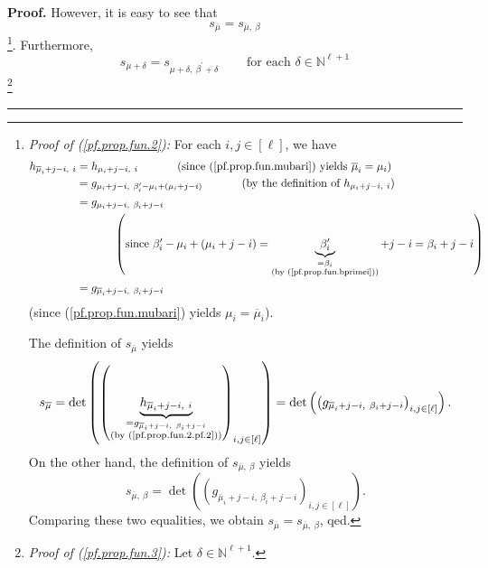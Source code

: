 \documentclass[numbers=enddot,12pt,final,onecolumn,notitlepage,english]{scrartcl}%
\theoremstyle{definition}
\newenvironment{proof}[1][Proof]{\noindent\textbf{#1.} }{\ \rule{0.5em}{0.5em}}
\newenvironment{verlong}{}{}
\begin{document}
\begin{verlong}
\begin{proof}
However, it is easy to see that%
\begin{equation}
s_{\overline{\mu}}=s_{\overline{\mu},\ \beta} \label{pf.prop.fun.2}%
\end{equation}
\footnote{\textit{Proof of (\ref{pf.prop.fun.2}):} For each $i,j\in\left[
\ell\right]  $, we have%
\begin{align}
h_{\overline{\mu}_{i}+j-i,\ i}  &  =h_{\mu_{i}+j-i,\ i}%
\ \ \ \ \ \ \ \ \ \ \left(  \text{since (\ref{pf.prop.fun.mubari}) yields
}\overline{\mu}_{i}=\mu_{i}\right) \nonumber\\
&  =g_{\mu_{i}+j-i,\ \beta_{i}^{\prime}-\mu_{i}+\left(  \mu_{i}+j-i\right)
}\ \ \ \ \ \ \ \ \ \ \left(  \text{by the definition of }h_{\mu_{i}%
+j-i,\ i}\right) \nonumber\\
&  =g_{\mu_{i}+j-i,\ \beta_{i}+j-i}\nonumber\\
&  \ \ \ \ \ \ \ \ \ \ \left(  \text{since }\beta_{i}^{\prime}-\mu_{i}+\left(
\mu_{i}+j-i\right)  =\underbrace{\beta_{i}^{\prime}}_{\substack{=\beta
_{i}\\\text{(by (\ref{pf.prop.fun.bprimei}))}}}+j-i=\beta_{i}+j-i\right)
\nonumber\\
&  =g_{\overline{\mu}_{i}+j-i,\ \beta_{i}+j-i} \label{pf.prop.fun.2.pf.2}%
\end{align}
(since (\ref{pf.prop.fun.mubari}) yields $\mu_{i}=\overline{\mu}_{i}$).
\par
The definition of $s_{\overline{\mu}}$ yields%
\[
s_{\overline{\mu}}=\det\left(  \left(  \underbrace{h_{\overline{\mu}%
_{i}+j-i,\ i}}_{\substack{=g_{\overline{\mu}_{i}+j-i,\ \beta_{i}%
+j-i}\\\text{(by (\ref{pf.prop.fun.2.pf.2}))}}}\right)  _{i,j\in\left[
\ell\right]  }\right)  =\det\left(  \left(  g_{\overline{\mu}_{i}%
+j-i,\ \beta_{i}+j-i}\right)  _{i,j\in\left[  \ell\right]  }\right)  .
\]
On the other hand, the definition of $s_{\overline{\mu},\ \beta}$ yields%
\[
s_{\overline{\mu},\ \beta}=\det\left(  \left(  g_{\overline{\mu}%
_{i}+j-i,\ \beta_{i}+j-i}\right)  _{i,j\in\left[  \ell\right]  }\right)  .
\]
Comparing these two equalities, we obtain $s_{\overline{\mu}}=s_{\overline
{\mu},\ \beta}$, qed.}. Furthermore,
\begin{equation}
s_{\mu+\delta}=s_{\mu+\delta,\ \beta^{\prime}+\delta}%
\ \ \ \ \ \ \ \ \ \ \text{for each }\delta\in\mathbb{N}^{\ell+1}
\label{pf.prop.fun.3}%
\end{equation}
\footnote{\textit{Proof of (\ref{pf.prop.fun.3}):} Let $\delta\in
\mathbb{N}^{\ell+1}$.
\par
}
\end{proof}
\end{verlong}
\end{document}
